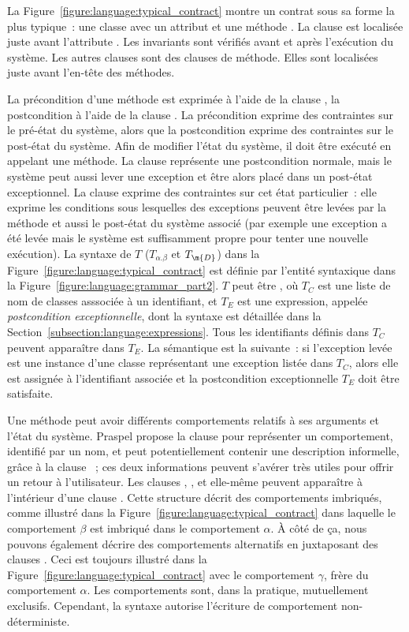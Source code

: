 La Figure~\ref{figure:language:typical_contract} montre un contrat sous sa forme
la plus typique~: une classe  avec un attribut  et une méthode
. La clause \ainvariant est localisée juste avant l'attribute .
Les invariants sont vérifiés avant et après l'exécution du système. Les autres
clauses sont des clauses de méthode. Elles sont localisées juste avant l'en-tête
des méthodes.

La précondition d'une méthode est exprimée à l'aide de la clause \arequires, la
postcondition à l'aide de la clause \aensures. La précondition exprime des
contraintes sur le pré-état du système, alors que la postcondition exprime des
contraintes sur le post-état du système. Afin de modifier l'état du système, il
doit être exécuté en appelant une méthode. La clause \aensures représente une
postcondition normale, mais le système peut aussi lever une exception et être
alors placé dans un post-état exceptionnel. La clause \athrowable exprime des
contraintes sur cet état particulier~: elle exprime les conditions sous
lesquelles des exceptions peuvent être levées par la méthode et aussi le
post-état du système associé (par exemple une exception a été levée mais le
système est suffisamment propre pour tenter une nouvelle exécution). La syntaxe
de $T$ ($T_{\alpha.\beta}$ et $T_\m{D}$) dans la
Figure~\ref{figure:language:typical_contract} est définie par l'entité
syntaxique  dans la
Figure~\ref{figure:language:grammar_part2}. $T$ peut être , où $T_C$ est une liste de nom de classes asssociée à un identifiant, et
$T_E$ est une expression, appelée {\em postcondition exceptionnelle}, dont la
syntaxe est détaillée dans la Section~\ref{subsection:language:expressions}.
Tous les identifiants définis dans $T_C$ peuvent apparaître dans $T_E$. La
sémantique est la suivante~: si l'exception levée est une instance d'une classe
représentant une exception listée dans $T_C$, alors elle est assignée à
l'identifiant associée et la postcondition exceptionnelle $T_E$ doit être
satisfaite.

Une méthode peut avoir différents comportements relatifs à ses arguments et
l'état du système. Praspel propose la clause \abehavior pour représenter un
comportement, identifié par un nom, et peut potentiellement contenir une
description informelle, grâce à la clause \adescription~; ces deux informations
peuvent s'avérer très utiles pour offrir un retour à l'utilisateur. Les clauses
\arequires, \aensures, \athrowable et \abehavior elle-même peuvent apparaître à
l'intérieur d'une clause \abehavior. Cette structure décrit des comportements
imbriqués, comme illustré dans la Figure~\ref{figure:language:typical_contract}
dans laquelle le comportement $\beta$ est imbriqué dans le comportement
$\alpha$. À côté de ça, nous pouvons également décrire des comportements
alternatifs en juxtaposant des clauses \abehavior. Ceci est toujours illustré
dans la Figure~\ref{figure:language:typical_contract} avec le comportement
$\gamma$, frère du comportement $\alpha$. Les comportements sont, dans la
pratique, mutuellement exclusifs. Cependant, la syntaxe autorise l'écriture de
comportement non-déterministe.

